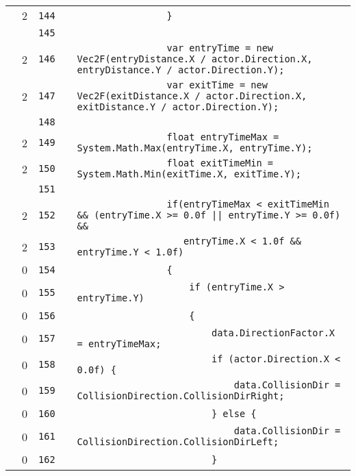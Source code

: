 \documentclass[a4paper,landscape,10pt]{article}
\begin{document}
\begin{longtable}[l]{lrrll}
\cellcolor{green} & 2 & \verb~144~ & & \verb~                }~\\
\cellcolor{gray} &  & \verb~145~ & & \verb~~\\
\cellcolor{green} & 2 & \verb~146~ & & \verb~                var entryTime = new Vec2F(entryDistance.X / actor.Direction.X, entryDistance.Y / actor.Direction.Y);~\\
\cellcolor{green} & 2 & \verb~147~ & & \verb~                var exitTime = new Vec2F(exitDistance.X / actor.Direction.X, exitDistance.Y / actor.Direction.Y);~\\
\cellcolor{gray} &  & \verb~148~ & & \verb~~\\
\cellcolor{green} & 2 & \verb~149~ & & \verb~                float entryTimeMax = System.Math.Max(entryTime.X, entryTime.Y);~\\
\cellcolor{green} & 2 & \verb~150~ & & \verb~                float exitTimeMin = System.Math.Min(exitTime.X, exitTime.Y);~\\
\cellcolor{gray} &  & \verb~151~ & & \verb~~\\
\cellcolor{orange} & 2 & \verb~152~ & & \verb~                if(entryTimeMax < exitTimeMin && (entryTime.X >= 0.0f || entryTime.Y >= 0.0f) &&~\\
\cellcolor{green} & 2 & \verb~153~ & & \verb~                   entryTime.X < 1.0f && entryTime.Y < 1.0f)~\\
\cellcolor{red} & 0 & \verb~154~ & & \verb~                {~\\
\cellcolor{red} & 0 & \verb~155~ & & \verb~                    if (entryTime.X > entryTime.Y)~\\
\cellcolor{red} & 0 & \verb~156~ & & \verb~                    {~\\
\cellcolor{red} & 0 & \verb~157~ & & \verb~                        data.DirectionFactor.X = entryTimeMax;~\\
\cellcolor{red} & 0 & \verb~158~ & & \verb~                        if (actor.Direction.X < 0.0f) {~\\
\cellcolor{red} & 0 & \verb~159~ & & \verb~                            data.CollisionDir = CollisionDirection.CollisionDirRight;~\\
\cellcolor{red} & 0 & \verb~160~ & & \verb~                        } else {~\\
\cellcolor{red} & 0 & \verb~161~ & & \verb~                            data.CollisionDir = CollisionDirection.CollisionDirLeft;~\\
\cellcolor{red} & 0 & \verb~162~ & & \verb~                        }~\\

\end{longtable}
\end{document}
